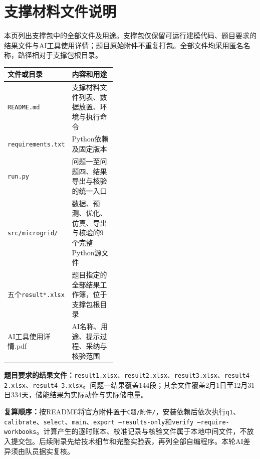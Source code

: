 \documentclass[UTF8,fontset=none,12pt,a4paper]{ctexart}
\newcommand{\sourceinput}[1]{}
\begin{document}
\section{支撑材料文件说明}
\noindent 本页列出支撑包中的全部文件及用途。支撑包仅保留可运行建模代码、题目要求的结果文件与AI工具使用详情；题目原始附件不重复打包。全部文件均采用匿名名称，路径相对于支撑包根目录。
\begin{center}\small
\begin{tabularx}{\linewidth}{>{\raggedright\arraybackslash}p{0.43\linewidth}Y}\toprule
文件或目录&内容和用途\\\midrule
\texttt{README.md}&支撑材料文件列表、数据放置、环境与执行命令\\
\texttt{requirements.txt}&Python依赖及固定版本\\
\texttt{run.py}&问题一至问题四、结果导出与核验的统一入口\\
\texttt{src/microgrid/}&数据、预测、优化、仿真、导出与核验的9个完整Python源文件\\
五个\texttt{result*.xlsx}&题目指定的全部结果工作簿，位于支撑包根目录\\
AI工具使用详情.pdf&AI名称、用途、提示过程、采纳与核验范围\\\bottomrule
\end{tabularx}
\end{center}
\noindent\textbf{题目要求的结果文件：}\texttt{result1.xlsx}、\texttt{result2.xlsx}、\texttt{result3.xlsx}、\texttt{result4-2.xlsx}、\texttt{result4-3.xlsx}。问题一结果覆盖144段；其余文件覆盖2月1日至12月31日334天，储能结果为实际动作与实际储电量。

\noindent\textbf{复算顺序：}按README将官方附件置于\texttt{C题/附件/}，安装依赖后依次执行\texttt{q1}、\texttt{calibrate}、\texttt{select}、\texttt{main}、\texttt{export --results-only}和\texttt{verify --require-workbooks}。计算产生的逐时账本、校准记录与核验文件属于本地中间文件，不放入提交包。后续附录先给技术细节和完整实验表，再列全部自编程序。本轮AI差异须由队员据实复核。
\clearpage

\clearpage
\sourceinput{appendix}
\end{document}
